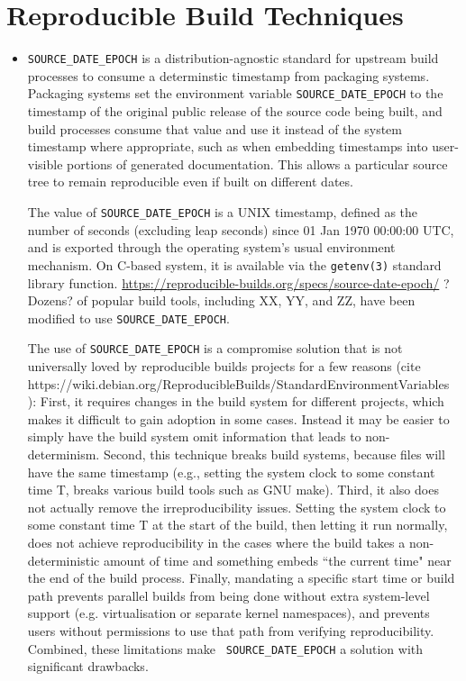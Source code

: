 \section{Reproducible Build Techniques}
\label{SEC:techniques}


\begin{itemize}

\item {\tt SOURCE\_DATE\_EPOCH} is a distribution-agnostic standard for
upstream build processes to consume a determinstic timestamp from packaging
systems.
Packaging systems set the environment variable \texttt{SOURCE\_DATE\_EPOCH} to the timestamp of the original public release of the source code being built,
and build processes consume that value and use it instead of the system timestamp where appropriate,
such as when embedding timestamps into user-visible portions of generated documentation.
This allows a particular source tree  to remain reproducible even if built on different dates.

The value of {\tt SOURCE\_DATE\_EPOCH} is a UNIX timestamp, defined as the number of seconds
(excluding leap seconds) since 01 Jan 1970 00:00:00 UTC, and is exported 
through the operating system's usual environment mechanism.
On C-based system, it is available via the {\tt getenv(3)} standard library function.
\url{https://reproducible-builds.org/specs/source-date-epoch/}
?Dozens? of popular build tools, including XX, YY, and ZZ, have been 
modified to use {\tt SOURCE\_DATE\_EPOCH}.

The use of {\tt SOURCE\_DATE\_EPOCH} is a compromise solution that is not 
universally loved by reproducible builds projects for a few reasons
(cite https://wiki.debian.org/ReproducibleBuilds/StandardEnvironmentVariables 
):
First, it requires changes in the build system for different projects, which
makes it difficult to gain adoption in some cases.  Instead it may be easier
to simply have the build system omit information that leads to non-determinism.
Second, this technique breaks build systems, because files will have the
same timestamp (e.g., setting the system clock to some constant time T, 
breaks various build tools such as GNU make).  Third, it also does not
actually remove the irreproducibility issues.  Setting the system clock to 
some constant time T at the start of the build, then letting it run normally, 
does not achieve reproducibility in the cases where the build takes a 
non-deterministic amount of time and something embeds ``the current time" 
near the end of the build process.  Finally, mandating a specific start
time or build path prevents parallel builds from being done without extra
system-level support (e.g. virtualisation or separate kernel namespaces),
and prevents users without permissions to use that path from verifying
reproducibility.  Combined, these limitations make {\tt
SOURCE\_DATE\_EPOCH} a solution with significant drawbacks.


\end{itemize}
